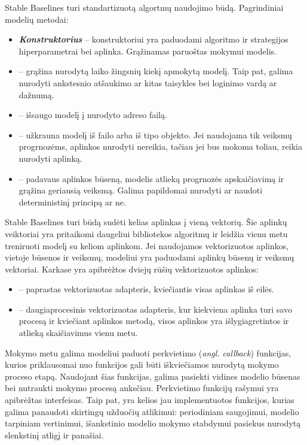 \documentclass{VUMIFPSbakalaurinis}
\begin{document}
\label{subsubsubsec:stable-baselines_framework}
{
	Stable Baselines turi standartizuotą algortmų naudojimo būdą. Pagrindiniai modelių metodai:
	\begin{itemize}
		\item \textbf{\textit{Konstruktorius}} -- konstruktoriui yra paduodami algoritmo ir strategijos hiperparametrai bei aplinka. Grąžinamas paruoštas mokymui modelis.
		
		\item \textbf{} -- grąžina nurodytą laiko žingsnių kiekį apmokytą modelį. Taip pat, galima nurodyti ankstesnio atšaukimo ar kitas taisykles bei loginimo vardą ar dažnumą.
		
		\item  \textbf{} -- išsaugo modelį į nurodyto adreso failą.
		
		\item  \textbf{} -- užkrauna modelį iš failo arba iš  tipo objekto. Jei naudojama tik veiksmų progrnozėms, aplinkos nurodyti nereikia, tačiau jei bus mokoma toliau, reikia nurodyti aplinką.
		
		\item \textbf{} -- padavaus aplinkos būseną, modelis atlieką progrnozės apskaičiavimą ir grąžina geriausią veiksmą. Galima papildomai nurodyti ar naudoti deterministinį principą ar ne.
	\end{itemize}
	
	Stable Baselines turi būdą sudėti kelias aplinkas į vieną vektorių. Šie aplinkų veiktoriai yra pritaikomi daugeliui bibliotekos algoritmų ir leidžia vienu metu treniruoti modelį su keliom aplinkom. Jei naudojamos vektorizuotos aplinkos, vietoje būsenos ir veiksmų, modeliui yra paduodami aplinkų būsenų ir veiksmų vektoriai. Karkase yra apibrėžtos dviejų rūšių vektorizuotos aplinkos:
	\begin{itemize}
		\item \textbf{} -- paprastas vektorizuotas adapteris, kviečiantis visas aplinkas iš eilės.
		\item \textbf{} -- daugiaprocesinis vektorizuotas adapteris, kur kiekviena aplinka turi savo procesą ir kviečiant aplinkos metodą, visos aplinkos yra išlygiagretintos ir atlieką skaičiavimus vienu metu.
	\end{itemize}

	Mokymo metu galima modeliui paduoti perkvietimo (\textit{angl. callback}) funkcijas, kurios priklausomai nuo funkcijos gali būti iškviečiamos nurodytą mokymo proceso etapą. Naudojant šias funkcijas, galima pasiekti vidines modelio būsenas bei nutraukti mokymo procesą anksčiau. Perkvietimo funkcijų rašymui yra apibrėžtas  interfeisas. Taip pat, yra kelios jau implementuotos funkcijos, kurias galima panaudoti skirtingų užduočių atlikimui: periodiniam saugojimui, modelio tarpiniam vertinimui, išankstinio modelio mokymo stabdymui pasiekus nurodytą slenkstinį atligį ir panašiai.
	
}
\end{document}
